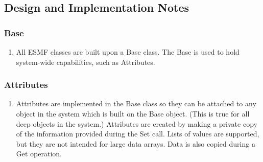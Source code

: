 
\subsection{Design and Implementation Notes}

\subsubsection{Base}

\begin{enumerate}

\item All ESMF classes are built upon a Base class.  The Base is used to hold 
system-wide capabilities, such as Attributes.

\end{enumerate}

\subsubsection{Attributes}

\begin{enumerate}

\item Attributes are implemented in the Base class so they can be attached to
any object in the system which is built on the Base object.  (This is true
for all deep objects in the system.)  Attributes are created by making a
private copy of the information provided during the Set call.  Lists of
values are supported, but they are not intended for large
data arrays.   Data is also copied during a Get operation.

\end{enumerate}
